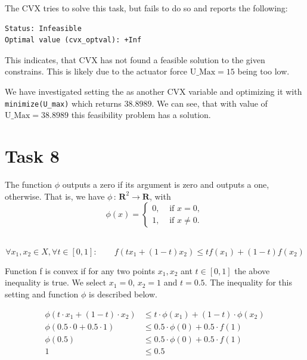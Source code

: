 The CVX tries to solve this task, but fails to do so and reports the following:
\begin{lstlisting}
Status: Infeasible
Optimal value (cvx_optval): +Inf
\end{lstlisting}

This indicates, that CVX has not found a feasible solution to the given constrains. This is likely due to the actuator force $\text{U\_Max}=15$ being too low. 

We have investigated setting the  as another CVX variable and optimizing it with \lstinline{minimize(U_max)} which returns $38.8989$. We can see, that with value of $\text{U\_Max}=38.8989$ this feasibility problem has a solution.

\section{Task 8}
The function $\phi$ outputs a zero if its argument is zero and outputs a one, otherwise. That is, we have $\phi\,:\,{\mathbf R}^2 \rightarrow {\mathbf R}$, with $$\phi(x) = \left\{ \begin{array}{ll} 0,  & \text{ if } x = 0, \\ 1, & \text{ if }x \neq 0. \end{array} \right.$$

\noindent{}\\

\begin{equation}
	\forall x_1, x_2 \in X, \forall t \in [0, 1]: \qquad f(tx_1+(1-t)x_2)\leq t f(x_1)+(1-t)f(x_2)
\end{equation}

Function f is convex if for any two points $x_{1}, x_{2}$ ant $t\in[0, 1]$ the above inequality is true. We select $x_{1} = 0$, $x_{2} = 1$ and $t=0.5$. The inequality for this setting and function $\phi$ is described below.

\begin{equation}
\begin{split}
	\phi(t \cdot x_1+(1-t) \cdot x_2) &\leq t \cdot \phi(x_1)+(1-t) \cdot \phi(x_2)\\
	\phi(0.5 \cdot 0 + 0.5 \cdot 1) &\leq 0.5 \cdot \phi(0) + 0.5 \cdot f(1)\\
	\phi(0.5) &\leq 0.5 \cdot \phi(0) + 0.5 \cdot f(1)\\
	1 &\leq 0.5
\end{split}
\end{equation}

